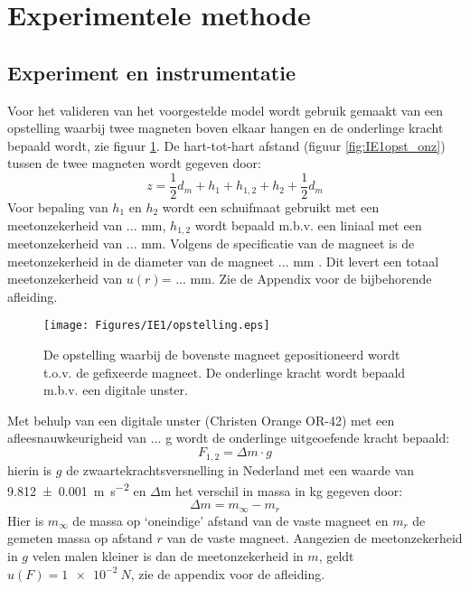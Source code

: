 \section{Experimentele methode}
\subsection{Experiment en instrumentatie}
Voor het valideren van het voorgestelde model wordt gebruik gemaakt van een opstelling waarbij twee magneten boven elkaar hangen en de onderlinge kracht bepaald wordt, zie figuur \ref{fig:IE1opstelling}. De hart-tot-hart afstand (figuur \ref{fig:IE1opst_onz}) tussen de twee magneten wordt gegeven door:
%
\begin{equation}
z=\frac{1}{2} d_{m}+h_{1}+h_{1,2}+h_{2}+\frac{1}{2} d_{m}
\label{eq:afstanden}
\end{equation}
%
Voor bepaling van $h_1$ en $h_2$ wordt een schuifmaat \href{https://youtu.be/eBG2Y0nXGAs}{\faCamera} gebruikt met een meetonzekerheid van ... mm, $h_{1,2}$ wordt bepaald m.b.v. een liniaal met een meetonzekerheid van ... mm. Volgens de specificatie van de magneet is de meetonzekerheid in de diameter van de magneet ... mm \citep{supermagnete_data_sheet_s-10-05-npdf_2011}. Dit levert een totaal meetonzekerheid van $u(r)$= ... mm. Zie de Appendix voor de bijbehorende afleiding.

\begin{figure}[h!]
    \centering
    \texttt{[image: Figures/IE1/opstelling.eps]}
    \caption{De opstelling waarbij de bovenste magneet gepositioneerd wordt t.o.v. de gefixeerde magneet. De onderlinge kracht wordt bepaald m.b.v. een digitale unster.}
    \label{fig:IE1opstelling}
\end{figure}

Met behulp van een digitale unster (Christen Orange OR-42) met een afleesnauwkeurigheid van ... g wordt de onderlinge uitgeoefende kracht bepaald:
%
\begin{equation}\label{eq:Fz}
F_{1,2}=\Delta m \cdot g
\end{equation}
%
hierin is $g$ de zwaartekrachtsversnelling in Nederland met een waarde van \SI{9.812\pm 0.001}{m\per s^2} en $\Delta$m het verschil in massa in kg gegeven door:
%
\begin{equation}
\Delta m=m_{\infty}-m_{r}
\end{equation}
%
Hier is $m_{\infty}$ de massa op ‘oneindige’ afstand van de vaste magneet en $m_r$ de gemeten massa op afstand $r$ van de vaste magneet.
Aangezien de meetonzekerheid in $g$ velen malen kleiner is dan de meetonzekerheid in $m$, geldt 
$u(F) = \SI{1e-2}{N}$, zie de appendix voor de afleiding.

